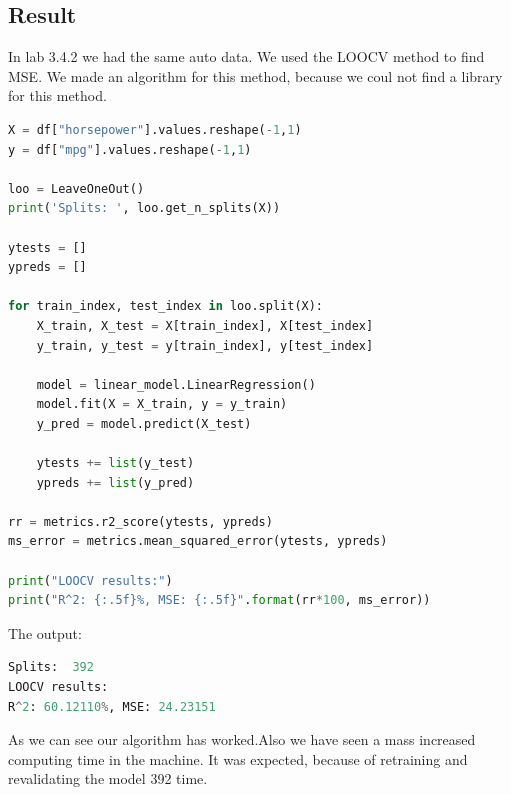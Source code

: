 \subsection{Result}
In lab 3.4.2 we had the same auto data. We used the LOOCV method to find MSE. We made an algorithm for this method, because we coul not find a library for this method.

\begin{lstlisting}[language=Python]
X = df["horsepower"].values.reshape(-1,1)
y = df["mpg"].values.reshape(-1,1) 

loo = LeaveOneOut()
print('Splits: ', loo.get_n_splits(X))

ytests = []
ypreds = []

for train_index, test_index in loo.split(X):
	X_train, X_test = X[train_index], X[test_index]
	y_train, y_test = y[train_index], y[test_index]

	model = linear_model.LinearRegression()
	model.fit(X = X_train, y = y_train)
	y_pred = model.predict(X_test)

	ytests += list(y_test)
	ypreds += list(y_pred)
	
rr = metrics.r2_score(ytests, ypreds)
ms_error = metrics.mean_squared_error(ytests, ypreds)

print("LOOCV results:")
print("R^2: {:.5f}%, MSE: {:.5f}".format(rr*100, ms_error))
\end{lstlisting}

The output:
\begin{lstlisting}[language=Python]
Splits:  392
LOOCV results:
R^2: 60.12110%, MSE: 24.23151
\end{lstlisting}

As we can see our algorithm has worked.Also we have seen a mass increased computing time in the machine. It was expected, because of retraining and revalidating the model 392 time.